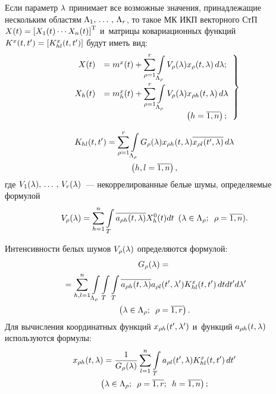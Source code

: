 \begin{multicols}{2}
Если параметр $\lambda$ принимает все возможные значения, принадлежащие нескольким 
областям $\Lambda_1,\,\ldots\,,\, \Lambda_r$, то такое МК ИКП 
векторного СтП $X(t) \hm=\lk X_1(t) \cdots X_n(t)\rk^{\mathrm{T}}$ и~матрицы ковариационных 
функций $K^x (t,t')\hm = \lk K_{hl}^x (t,t')\rk$  будут иметь вид:
   \begin{equation}
   \left.
   \begin{array}{rl}
    X(t) &= m^x (t) +\displaystyle \sum\limits_{\rho =1}^r \int\limits_{\Lambda_\rho} V_\rho (\la) x_\rho 
(t,\la) \,d\la;
\\[6pt]
    X_h(t) &= m_h^x(t) +\displaystyle\sum\limits_{\rho =1}^r \int\limits_{\Lambda_\rho} V_\rho (\la) 
x_{\rho h} (t,\la) \,d\la\\[6pt]
& \hspace*{35mm}\left(h=\overline{1,n}\right);
\end{array}
\right\}
\label{e2.12-s}
\end{equation}

\vspace*{-12pt}

\noindent
\begin{multline}
    K_{hl}(t, t') =\sum\limits_{\rho =1}^r \int\limits_{\Lambda_\rho} G_\rho (\lambda) x_{\rho 
h} (t,\lambda)\overline{x_{\rho l} (t',\lambda)} \,d\lambda\\ 
\left(h,l=\overline{1,n}\right),\label{e2.13-s}
\end{multline}
где $V_1(\lambda),\,\ldots\,,\, V_r(\lambda)$~--- некоррелированные белые шумы, определяемые 
формулой
\begin{equation*}
V_\rho (\lambda) = \sum\limits_{h=1}^n  \int\limits_{T} \overline{a_{\rho h} (t,\lambda)} X_h^0 
(t) dt\enskip (\lambda\in \Lambda_\rho; \enskip \rho=\overline{1,n}).
\end{equation*}

Интенсивности белых шумов $V_\rho (\lambda)$ определяются формулой:
  \begin{multline*}
  G_\rho (\lambda) = {}\\
  {}=
  \sum\limits_{h,l=1}^n   \int\limits_{\Lambda_\rho}\int\limits_{T}\int\limits_T 
\overline{a_{\rho h} (t,\lambda)}a_{\rho l}(t',\lambda') K_{hl}^x (t,t') \,dt dt'd\lambda'\\
\left (\lambda\in \Lambda_\rho; \enskip \rho=\overline{1,r}\right).
\end{multline*}
Для вычисления координатных функций $x_{\rho h} (t',\lambda')$ и~функций $a_{\rho h} 
(t,\lambda)$ используются формулы:
  \begin{multline}
  x_{\rho h} (t,\lambda) =\displaystyle\frac{\displaystyle 1\mathstrut}{\displaystyle G_\rho (\lambda)\mathstrut} \sum\limits_{l=1}^n \int\limits_T a_{\rho l} 
(t',\lambda)K_{hl}^x(t,t')\,dt'\\
 \left(\lambda\in \Lambda_\rho; \enskip 
\rho=\overline{1,r};\enskip h=\overline{1,n}\right);
\label{e2.16-s}
\end{multline}


\end{multicols}
